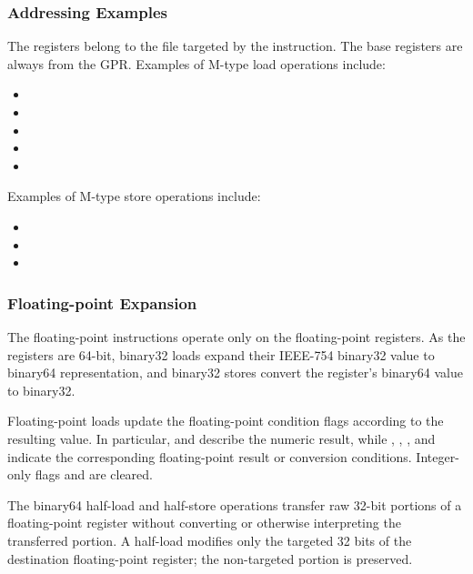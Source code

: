 \subsubsection{Addressing Examples}

The  registers belong to the file targeted by the instruction. The
base registers are always from the GPR. Examples of M-type load operations
include:

\begin{itemize}
  \item {}
  \item {}
  \item {}
  \item {}
  \item {}
\end{itemize}

\noindent
Examples of M-type store operations include:

\begin{itemize}
  \item {}
  \item {}
  \item {}
\end{itemize}

\subsubsection{Floating-point Expansion}

The floating-point instructions operate only on the floating-point registers.
As the registers are 64-bit, binary32 loads expand their IEEE-754 binary32
value to binary64 representation, and binary32 stores convert the register's
binary64 value to binary32.

Floating-point loads update the floating-point condition flags according to
the resulting value. In particular,  and  describe the
numeric result, while , , , and  indicate
the corresponding floating-point result or conversion conditions. Integer-only
flags  and  are cleared.

The binary64 half-load and half-store operations transfer raw 32-bit portions
of a floating-point register without converting or otherwise interpreting the
transferred portion. A half-load modifies only the targeted 32 bits of the
destination floating-point register; the non-targeted portion is preserved.


